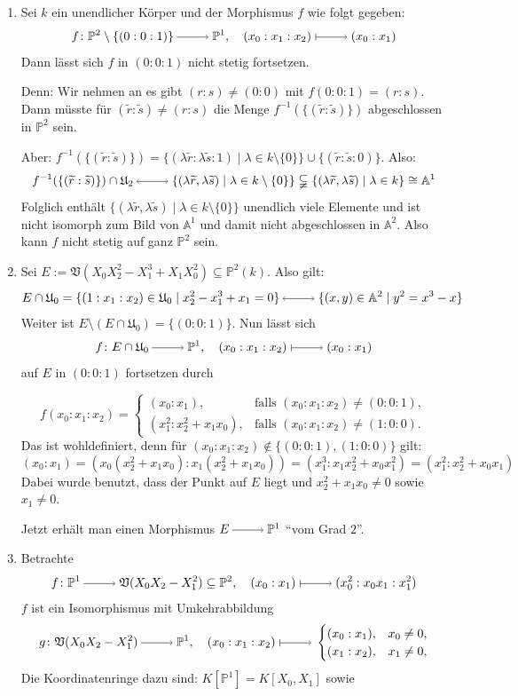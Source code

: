 \documentclass[a4paper,12pt,index=toc]{scrbook}
\theoremstyle{keinenummern} %
\def\A{\mathbb{A}}
\def\V{\mathfrak{V}}
\def\P{\mathbb{P}}
\def\U{\mathfrak{U}}
\newcommand{\schlange}[1]{\widetilde{#1}}
\begin{document}
\begin{bsp}\label{2.6.3}
\begin{enumerate}
  \item{} Sei $k$ ein unendlicher Körper und der Morphismus $f$ wie folgt gegeben:
\[f\colon \P^2\setminus \{(0:0:1)\}\ra \P^1, \quad (x_0:x_1:x_2)\mapsto (x_0:x_1)\]
Dann lässt sich $f$ in $(0:0:1)$ nicht stetig fortsetzen.

Denn: Wir nehmen an es gibt  $(r:s)\neq (0:0)$ mit $f(0:0:1)=(r:s)$. Dann müsste für $(\schlange{r}:\schlange{s})\neq (r:s)$ die Menge $f^{-1}(\{(\schlange{r}:\schlange{s})\})$ abgeschlossen in $\P^2$ sein.

Aber: $f^{-1}(\{(\schlange{r}:\schlange{s})\})=\{(\lambda \schlange{r}:\lambda \schlange{s}:1) \mid \lambda \in k\setminus \{0\}\}\cup\{(\schlange{r}:\schlange{s}:0)\}$. Also:
\[f^{-1}(\{(\schlange{r}:\schlange{s})\})\cap\U_2 \lra \{(\lambda \schlange{r},\lambda \schlange{s}) \mid \lambda \in k\setminus \{0\}\} \subsetneqq \{(\lambda \schlange{r},\lambda \schlange{s}) \mid \lambda \in k\} \cong \A^1\]
Folglich enthält $\{(\lambda \schlange{r}, \lambda \schlange{s}) \mid \lambda \in k\setminus \{0\}\}$ unendlich viele Elemente und ist nicht isomorph zum Bild von $\A^1$ und damit nicht abgeschlossen in $\A^2$. Also kann $f$ nicht stetig auf ganz $\P^2$ sein.
  \item{} Sei $E:=\V(X_0X_2^2-X_1^3+X_1X_0^{2}) \subseteq \P^2(k)$. Also gilt: 
  \[E\cap \U_0=\{(1:x_1:x_2) \in \U_0 \mid x_2^2-x_1^3+x_1=0\} \lra \{(x,y)\in \A^2 \mid y^2=x^3-x\}\]
Weiter ist $E\setminus (E\cap \U_0)=\{(0:0:1)\}$. Nun lässt sich 
\[f \colon E\cap\U_0\ra \P^1, \quad (x_0:x_1:x_2)\mapsto (x_0:x_1)\] auf $E$ in $(0:0:1)$ fortsetzen durch 

\[f(x_0:x_1:x_2)=\begin{cases} (x_0:x_1),&\text{falls } (x_0:x_1:x_2)\neq (0:0:1),\\ (x_1^2:x_2^2+x_1x_0),&\text{falls } (x_0:x_1:x_2)\neq (1:0:0). \end{cases}\] 
Das ist wohldefiniert, denn für $(x_0:x_1:x_2) \notin \{(0:0:1),(1:0:0)\}$ gilt:
\[(x_0:x_1)=(x_0(x_2^2+x_1x_0):x_1(x_2^2+x_1x_0))=(x_1^3:x_1x_2^2+x_0x_1^2)=(x_1^2:x_2^2+x_0x_1)\]
Dabei wurde benutzt, dass der Punkt auf $E$ liegt und $x_2^2+x_1x_0 \neq 0$ sowie $x_1 \neq 0$.

Jetzt erhält man einen Morphismus $E\ra \P^1$ \enquote{vom Grad $2$}.
  \item{} Betrachte
\[f\colon \P^1\ra \V(X_0X_2-X_1^2)\subseteq \P^2, \quad (x_0:x_1)\mapsto (x_0^2:x_0x_1:x_1^2)\]
$f$ ist ein Isomorphismus mit Umkehrabbildung
\[g\colon\V(X_0X_2-X_1^2)\ra \P^1, \quad (x_0:x_1:x_2)\mapsto \begin{cases} (x_0:x_1), &x_0 \neq 0,\\(x_1:x_2), &x_1 \neq 0, \end{cases} \]
Die Koordinatenringe dazu sind: $K[\P^1]=K[X_0,X_1]$ sowie


\end{enumerate}
\end{bsp}
\end{document}
